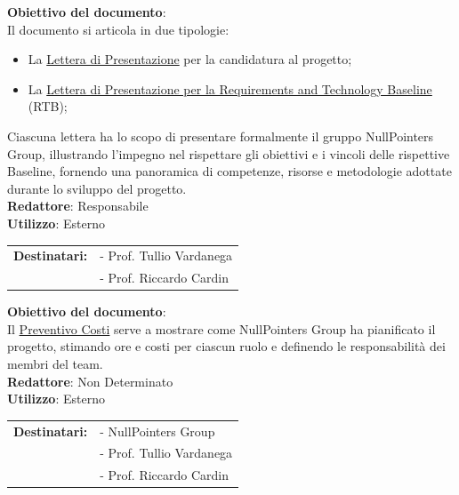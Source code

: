     \textbf{Obiettivo del documento}:\\
	Il documento si articola in due tipologie:
    \begin{itemize}[itemsep=3pt, parsep=1pt, label=$\scriptstyle\bullet$]
		\item La \href{https://nullpointersgroup.github.io/Documentazione/output/Candidatura/Lettera_di_Presentazione.pdf}{Lettera di Presentazione} per la candidatura al progetto;
		\item La \href{https://nullpointersgroup.github.io/Documentazione/output/RTB/Lettera_di_Presentazione_RTB.pdf}{Lettera di Presentazione per la Requirements and Technology Baseline} (RTB);
	\end{itemize}
	Ciascuna lettera ha lo scopo di presentare formalmente il gruppo NullPointers Group, illustrando l’impegno nel rispettare gli obiettivi e i vincoli delle rispettive Baseline, 
	fornendo una panoramica di competenze, risorse e metodologie adottate durante lo sviluppo del progetto.\\[0.5em]
	\medskip
	\textbf{Redattore}: Responsabile\\
	\medskip
	\textbf{Utilizzo}: Esterno\\
	\medskip 
	\begin{tabular}{@{}l l}
		\textbf{Destinatari:} & - Prof. Tullio Vardanega\\
							  & - Prof. Riccardo Cardin
	\end{tabular}

	\textbf{Obiettivo del documento}:\\
	Il \href{https://nullpointersgroup.github.io/Documentazione/output/Candidatura/Preventivo_Costi.pdf}{Preventivo Costi} serve a mostrare come NullPointers Group ha pianificato il progetto, stimando ore e costi per ciascun ruolo e definendo le responsabilità dei membri del team.\\[0.5em]
	\medskip
	\textbf{Redattore}: Non Determinato\\
	\medskip
	\textbf{Utilizzo}: Esterno\\
	\medskip 
	\begin{tabular}{@{}l l}
		\textbf{Destinatari:} & - NullPointers Group\\
		                      & - Prof. Tullio Vardanega\\
							  & - Prof. Riccardo Cardin
	\end{tabular}


